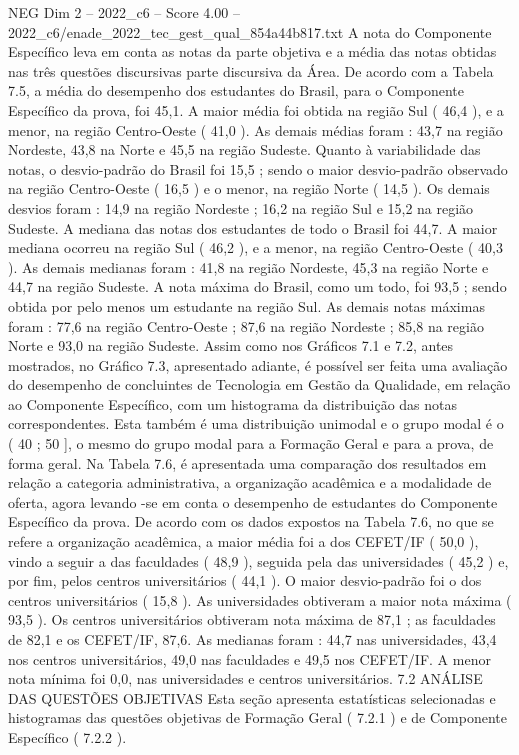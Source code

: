 \begin{textsample}{NEG Dim 2 – 2022\_c6 – Score 4.00 – 2022\_c6/enade\_2022\_tec\_gest\_qual\_854a44b817.txt}
A nota do Componente Específico leva em conta as notas da parte objetiva e a média das notas obtidas nas três questões discursivas parte discursiva da Área.
De acordo com a Tabela 7.5, a média do desempenho dos estudantes do Brasil, para o Componente Específico da prova, foi 45,1.
A maior média foi obtida na região Sul ( 46,4 ), e a menor, na região Centro-Oeste ( 41,0 ).
As demais médias foram : 43,7 na região Nordeste, 43,8 na Norte e 45,5 na região Sudeste.
Quanto à variabilidade das notas, o desvio-padrão do Brasil foi 15,5 ; sendo o maior desvio-padrão observado na região Centro-Oeste ( 16,5 ) e o menor, na região Norte ( 14,5 ).
Os demais desvios foram : 14,9 na região Nordeste ; 16,2 na região Sul e 15,2 na região Sudeste.
A mediana das notas dos estudantes de todo o Brasil foi 44,7.
A maior mediana ocorreu na região Sul ( 46,2 ), e a menor, na região Centro-Oeste ( 40,3 ).
As demais medianas foram : 41,8 na região Nordeste, 45,3 na região Norte e 44,7 na região Sudeste.
A nota máxima do Brasil, como um todo, foi 93,5 ; sendo obtida por pelo menos um estudante na região Sul.
As demais notas máximas foram : 77,6 na região Centro-Oeste ; 87,6 na região Nordeste ; 85,8 na região Norte e 93,0 na região Sudeste.
Assim como nos Gráficos 7.1 e 7.2, antes mostrados, no Gráfico 7.3, apresentado adiante, é possível ser feita uma avaliação do desempenho de concluintes de Tecnologia em Gestão da Qualidade, em relação ao Componente Específico, com um histograma da distribuição das notas correspondentes.
Esta também é uma distribuição unimodal e o grupo modal é o ( 40 ; 50 ], o mesmo do grupo modal para a Formação Geral e para a prova, de forma geral.
Na Tabela 7.6, é apresentada uma comparação dos resultados em relação a categoria administrativa, a organização acadêmica e a modalidade de oferta, agora levando -se em conta o desempenho de estudantes do Componente Específico da prova.
De acordo com os dados expostos na Tabela 7.6, no que se refere a organização acadêmica, a maior média foi a dos CEFET/IF ( 50,0 ), vindo a seguir a das faculdades ( 48,9 ), seguida pela das universidades ( 45,2 ) e, por fim, pelos centros universitários ( 44,1 ).
O maior desvio-padrão foi o dos centros universitários ( 15,8 ).
As universidades obtiveram a maior nota máxima ( 93,5 ).
Os centros universitários obtiveram nota máxima de 87,1 ; as faculdades de 82,1 e os CEFET/IF, 87,6.
As medianas foram : 44,7 nas universidades, 43,4 nos centros universitários, 49,0 nas faculdades e 49,5 nos CEFET/IF.
A menor nota mínima foi 0,0, nas universidades e centros universitários. 7.2 ANÁLISE DAS QUESTÕES OBJETIVAS Esta seção apresenta estatísticas selecionadas e histogramas das questões objetivas de Formação Geral ( 7.2.1 ) e de Componente Específico ( 7.2.2 ).

\end{textsample}
